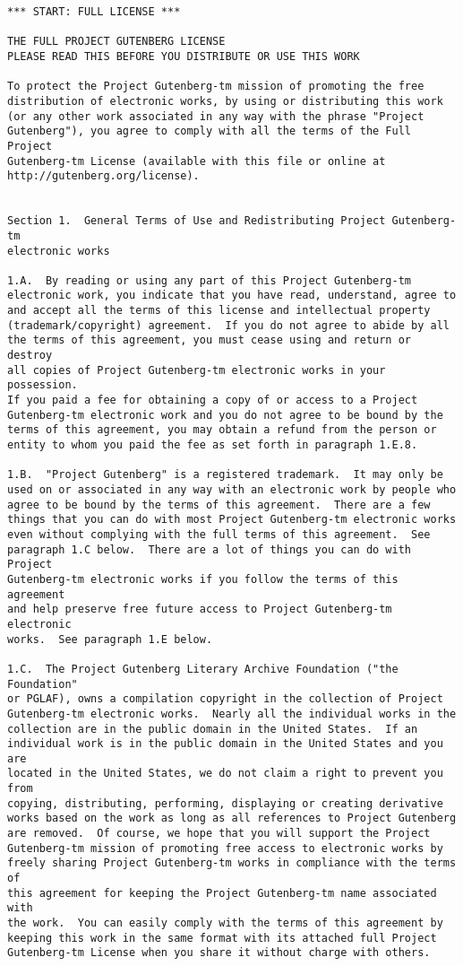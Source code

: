 \begin{Verbatim}[fontsize=\footnotesize]
*** START: FULL LICENSE ***

THE FULL PROJECT GUTENBERG LICENSE
PLEASE READ THIS BEFORE YOU DISTRIBUTE OR USE THIS WORK

To protect the Project Gutenberg-tm mission of promoting the free
distribution of electronic works, by using or distributing this work
(or any other work associated in any way with the phrase "Project
Gutenberg"), you agree to comply with all the terms of the Full Project
Gutenberg-tm License (available with this file or online at
http://gutenberg.org/license).


Section 1.  General Terms of Use and Redistributing Project Gutenberg-tm
electronic works

1.A.  By reading or using any part of this Project Gutenberg-tm
electronic work, you indicate that you have read, understand, agree to
and accept all the terms of this license and intellectual property
(trademark/copyright) agreement.  If you do not agree to abide by all
the terms of this agreement, you must cease using and return or destroy
all copies of Project Gutenberg-tm electronic works in your possession.
If you paid a fee for obtaining a copy of or access to a Project
Gutenberg-tm electronic work and you do not agree to be bound by the
terms of this agreement, you may obtain a refund from the person or
entity to whom you paid the fee as set forth in paragraph 1.E.8.

1.B.  "Project Gutenberg" is a registered trademark.  It may only be
used on or associated in any way with an electronic work by people who
agree to be bound by the terms of this agreement.  There are a few
things that you can do with most Project Gutenberg-tm electronic works
even without complying with the full terms of this agreement.  See
paragraph 1.C below.  There are a lot of things you can do with Project
Gutenberg-tm electronic works if you follow the terms of this agreement
and help preserve free future access to Project Gutenberg-tm electronic
works.  See paragraph 1.E below.

1.C.  The Project Gutenberg Literary Archive Foundation ("the Foundation"
or PGLAF), owns a compilation copyright in the collection of Project
Gutenberg-tm electronic works.  Nearly all the individual works in the
collection are in the public domain in the United States.  If an
individual work is in the public domain in the United States and you are
located in the United States, we do not claim a right to prevent you from
copying, distributing, performing, displaying or creating derivative
works based on the work as long as all references to Project Gutenberg
are removed.  Of course, we hope that you will support the Project
Gutenberg-tm mission of promoting free access to electronic works by
freely sharing Project Gutenberg-tm works in compliance with the terms of
this agreement for keeping the Project Gutenberg-tm name associated with
the work.  You can easily comply with the terms of this agreement by
keeping this work in the same format with its attached full Project
Gutenberg-tm License when you share it without charge with others.


\end{Verbatim}
